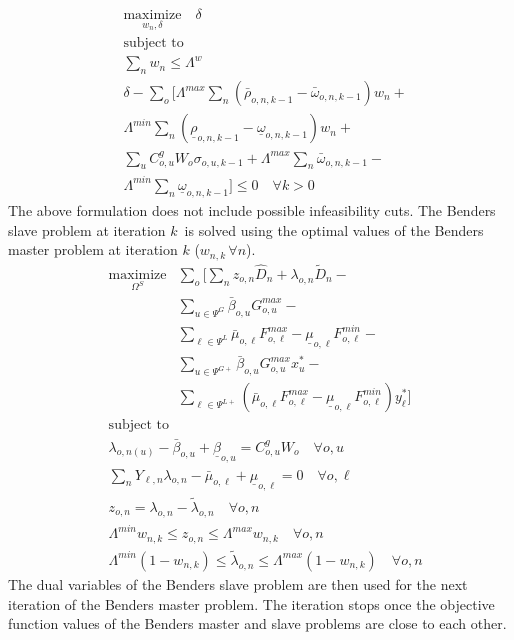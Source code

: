 \begin{align}
&\label{benders_master} \underset{w_n, \delta} {\text{maximize}} \quad \delta \\
&\text{subject to} \nonumber \\
&\sum\limits_n w_n \leq \Lambda^w \\
&\delta - \sum\limits_o \Big[ \Lambda^{max} \sum\limits_n (\bar{\rho}_{o, n, k-1} - \bar{\omega}_{o, n, k-1}) w_n + \nonumber \\
&\Lambda^{min} \sum\limits_n (\underline{\rho}_{o, n, k-1} - \underline{\omega}_{o, n, k-1})  w_n + \nonumber \\
&\sum\limits_u C^g_{o,u} W_o \sigma_{o, u, k-1} + \Lambda^{max} \sum\limits_n \bar{\omega}_{o, n, k-1} - \nonumber \\
&\Lambda^{min} \sum\limits_n \underline{\omega}_{o, n, k-1} \Big] \leq 0 \quad \forall k > 0
\end{align}
The above formulation does not include possible infeasibility cuts. The Benders slave problem at iteration $k$ is solved using the optimal values of the Benders master problem at iteration $k$ ($w_{n, k} \, \forall n$).
\begin{align}
\label{sub_obj} \underset{\Omega^{S}}{\text{maximize}} &\sum\limits_o \Bigg[ \sum\limits_n z_{o, n} \hat{D}_n + \lambda_{o, n} \tilde{D}_n - \nonumber \\
&\sum\limits_{u \in \Psi^G} \bar{\beta}_{o,u} G_{o,u}^{max} - \nonumber \\
&\sum\limits_{\ell \in \Psi^L} \bar{\mu}_{o,\ell} F_{o,\ell}^{max} - \underline{\mu}_{o,\ell} F_{o,\ell}^{min} - \nonumber \\
&\sum\limits_{u \in \Psi^{G+}} \bar{\beta}_{o,u} G_{o,u}^{max} x_u^* - \nonumber \\
&\sum\limits_{\ell \in \Psi^{L+}} \left( \bar{\mu}_{o,\ell} F_{o,\ell}^{max} - \underline{\mu}_{o,\ell} F_{o,\ell}^{min} \right) y_\ell^* \Bigg]
\end{align}
\begin{align}
&\text{subject to} \nonumber \\
&\lambda_{o, n(u)} - \bar{\beta}_{o,u} + \underline{\beta}_{o,u} = C^g_{o,u} W_o \quad \forall o, u \\
&\sum\limits_n Y_{\ell, n} \lambda_{o, n} - \bar{\mu}_{o, \ell} + \underline{\mu}_{o, \ell} = 0 \quad \forall o, \ell \\
&z_{o,n} = \lambda_{o, n} - \tilde{\lambda}_{o, n} \quad \forall o, n \\
&\Lambda^{min} w_{n, k} \leq z_{o, n} \leq \Lambda^{max} w_{n, k} \quad \forall o,n \\
&\Lambda^{min} (1 - w_{n, k}) \leq \tilde{\lambda}_{o, n} \leq \Lambda^{max} (1 - w_{n, k}) \quad \forall o,n
\end{align}
The dual variables of the Benders slave problem are then used for the next iteration of the Benders master problem. The iteration stops once the objective function values of the Benders master and slave problems are close to each other.


